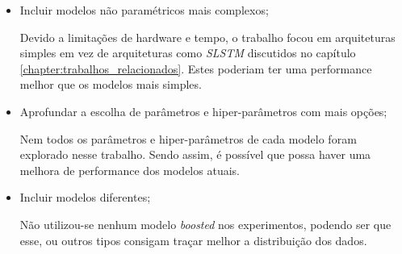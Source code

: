 \begin{itemize}
    \item Incluir modelos não paramétricos mais complexos;
    
    Devido a limitações de hardware e tempo, o trabalho focou em arquiteturas simples em vez de arquiteturas como \textit{\acrshort{SLSTM}} discutidos no capítulo \ref{chapter:trabalhos_relacionados}. Estes poderiam ter uma performance melhor que os modelos mais simples.
    
    \item Aprofundar a escolha de parâmetros e hiper-parâmetros com mais opções;
    
    Nem todos os parâmetros e hiper-parâmetros de cada modelo foram explorado nesse trabalho. Sendo assim, é possível que possa haver uma melhora de performance dos modelos atuais.
    
    \item Incluir modelos diferentes;
    
    Não utilizou-se nenhum modelo \textit{boosted} nos experimentos, podendo ser que esse, ou outros tipos consigam traçar melhor a distribuição dos dados.
    
\end{itemize}